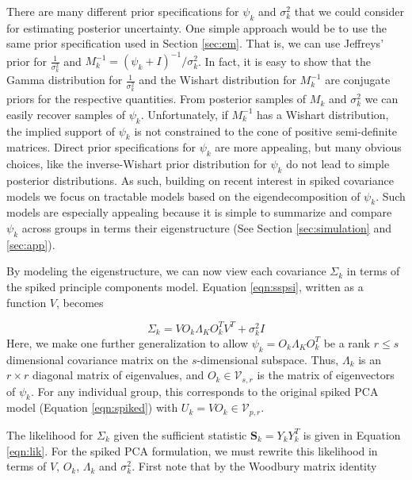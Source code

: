 \documentclass{article}
\begin{document}
There are many different prior specifications for $\psi_k$ and
$\sigma_k^2$ that we could consider for estimating posterior
uncertainty.  One simple approach would be to use the same prior
specification used in Section \ref{sec:em}.  That is, we can use
Jeffreys' prior for $\frac{1}{\sigma_k^2}$ and
$M_k^{-1} = (\psi_k + I) ^{-1}/\sigma_k^2$.  In fact, it is easy to
show that the Gamma distribution for $\frac{1}{\sigma_k^2}$ and the
Wishart distribution for $M_k^{-1}$ are conjugate priors for the
respective quantities.  From posterior samples of $M_k$ and
$\sigma_k^2$ we can easily recover samples of $\psi_k$.
Unfortunately, if $M_k^{-1}$ has a Wishart distribution, the implied
support of $\psi_k$ is not constrained to the cone of positive
semi-definite matrices.  Direct prior specifications for $\psi_k$ are
more appealing, but many obvious choices, like the inverse-Wishart
prior distribution for $\psi_k$ do not lead to simple posterior
distributions.  As such, building on recent interest in spiked
covariance models \citep{Donoho2013, Paul2007} we focus on
tractable models based on the eigendecomposition of $\psi_k$.  Such
models are especially appealing because it is simple to summarize and
compare $\psi_k$ across groups in terms their eigenstructure (See
Section \ref{sec:simulation} and \ref{sec:app}).

By modeling the eigenstructure, we can now view each covariance
$\Sigma_k$ in terms of the spiked principle components model.
Equation \ref{eqn:sspsi}, written as a function $V$, becomes

\begin{equation}
\Sigma_k = VO_k\Lambda_KO_k^TV^T + \sigma^2_kI
\label{eqn:ss}
\end{equation}
%
\noindent Here, we make one further generalization to allow
$\psi_k = O_k\Lambda_KO_k^T$ be a rank $r \leq s$ dimensional covariance
matrix on the $s$-dimensional subspace.  Thus, $\Lambda_k$ is an $r \times
r$ diagonal matrix of eigenvalues, and $O_k \in
\mathcal{V}_{s,r}$ is the matrix of eigenvectors of
$\psi_k$.  For any individual group, this corresponds to the original spiked
PCA model (Equation \ref{eqn:spiked}) with $U_k = VO_k \in
\mathcal{V}_{p, r}$.

The likelihood for $\Sigma_k$ given the sufficient statistic
$\mathbf{S}_k = Y_kY_k^T$ is given in Equation \ref{eqn:lik}.  For the
spiked PCA formulation, we must rewrite this likelihood in terms of $V$, $O_k$,
$\Lambda_k$ and $\sigma_k^2$.  First note that by the Woodbury matrix
identity
 
\end{document}
